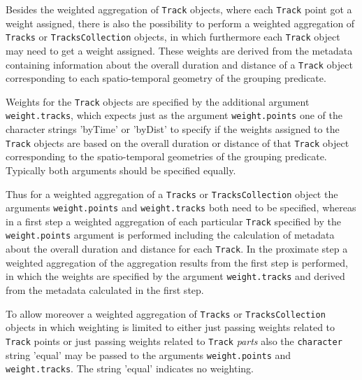 \documentclass[12pt, oneside, a4paper]{scrbook}
\let\code=\texttt
\begin{document}
Besides the weighted aggregation of \code{Track} objects, where each \code{Track} point got a weight assigned, there is also the possibility to perform a weighted aggregation of \code{Tracks} or \code{TracksCollection} objects, in which furthermore each \code{Track} object may need to get a weight assigned. These weights are derived from the metadata containing information about the overall duration and distance of a \code{Track} object corresponding to each spatio-temporal geometry of the grouping predicate.
\par\medskip
Weights for the \code{Track} objects are specified by the additional argument \code{weight.tracks}, which expects just as the argument \code{weight.points} one of the character strings 'byTime' or 'byDist' to specify if the weights assigned to the \code{Track} objects are based on the overall duration or distance of that \code{Track} object corresponding to the spatio-temporal geometries of the grouping predicate. Typically both arguments should be specified equally.
\par\medskip
Thus for a weighted aggregation of a \code{Tracks} or \code{TracksCollection} object the arguments \code{weight.points} and \code{weight.tracks} both need to be specified, whereas in a first step a weighted aggregation of each particular \code{Track} specified by the \code{weight.points} argument is performed including the calculation of metadata about the overall duration and distance for each \code{Track}.
In the proximate step a weighted aggregation of the aggregation results from the first step is performed, in which the weights are specified by the argument \code{weight.tracks} and derived from the metadata calculated in the first step.
\par\medskip
To allow moreover a weighted aggregation of \code{Tracks} or \code{TracksCollection} objects in which weighting is limited to either just passing weights related to \code{Track} points or just passing weights related to \code{Track} \textit{parts} also the \code{character} string 'equal' may be passed to the arguments \code{weight.points} and \code{weight.tracks}. The string 'equal' indicates no weighting.
\par\medskip

\end{document}
